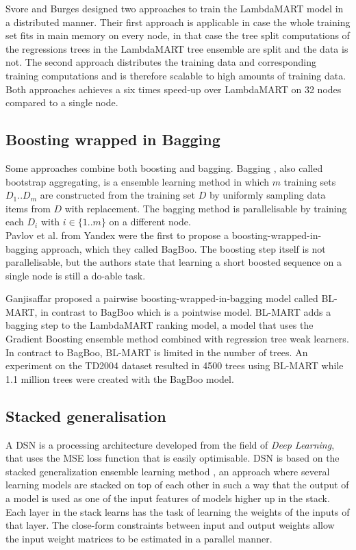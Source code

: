 Svore and Burges \cite{Svore2010,Svore2012} designed two approaches to train the LambdaMART \cite{Wu2008} model in a distributed manner. Their first approach is applicable in case the whole training set fits in main memory on every node, in that case the tree split computations of the regressions trees in the LambdaMART tree ensemble are split and the data is not. The second approach distributes the training data and corresponding training computations and is therefore scalable to high amounts of training data. Both approaches achieves a six times speed-up over LambdaMART on 32 nodes compared to a single node.

\subsection{Boosting wrapped in Bagging}
Some approaches combine both boosting and bagging. Bagging \cite{Breiman1996}, also called bootstrap aggregating, is a ensemble learning method in which $m$ training sets $D_1..D_m$ are constructed from the training set $D$ by uniformly sampling data items from $D$ with replacement. The bagging method is parallelisable by training each $D_i$ with $i \in \{1..m\}$ on a different node.\\

Pavlov et al. \cite{Pavlov2010} from Yandex were the first to propose a boosting-wrapped-in-bagging approach, which they called BagBoo. The boosting step itself is not parallelisable, but the authors state that learning a short boosted sequence on a single node is still a do-able task.

Ganjisaffar \cite{Ganjisaffar2011b} proposed a pairwise boosting-wrapped-in-bagging model called BL-MART, in contrast to BagBoo which is a pointwise model. BL-MART adds a bagging step to the LambdaMART \cite{Wu2008} ranking model, a model that uses the Gradient Boosting \cite{Friedman2002} ensemble method combined with regression tree weak learners. In contract to BagBoo, BL-MART is limited in the number of trees. An experiment on the TD2004 dataset resulted in 4500 trees using BL-MART while 1.1 million trees were created with the BagBoo model.

\subsection{Stacked generalisation}
A \ac{DSN} is a processing architecture developed from the field of \emph{Deep Learning}, that uses the \ac{MSE} loss function that is easily optimisable. \ac{DSN} is based on the stacked generalization ensemble learning method \cite{Wolpert1992}, an approach where several learning models are stacked on top of each other in such a way that the output of a model is used as one of the input features of models higher up in the stack. Each layer in the stack learns has the task of learning the weights of the inputs of that layer. The close-form constraints between input and output weights allow the input weight matrices to be estimated in a parallel manner.\\

